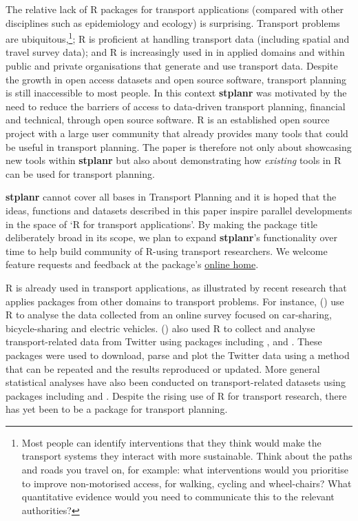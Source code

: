 The relative lack of R packages for transport applications
(compared with other disciplines such as epidemiology
and ecology) is surprising.
Transport
problems are ubiquitous,\footnote{Most people can identify interventions that they
  think would make the transport systems they interact with more
  sustainable. Think about the paths and roads you travel on, for
  example: what interventions would you prioritise to improve
  non-motorised access, for walking, cycling and wheel-chairs? What
  quantitative evidence would you need to communicate this to the
  relevant authorities?}; R is proficient at handling transport data
(including spatial and travel survey data);
and R is increasingly used in
in applied domains \citep{jalal_overview_2017,moore_why_2017}
and within public and private organisations that generate and use transport data.
Despite the growth in open access datasets and open source software, transport planning is still inaccessible to most people.
In this context \textbf{stplanr} was motivated by the need to reduce the barriers of access to data-driven transport planning, financial and technical, through open source software.
R is an established open source project with a large user community that already provides many tools that could be useful in transport planning.
The paper is therefore not only about showcasing new tools within \textbf{stplanr} but also about demonstrating how \emph{existing} tools in R can be used for transport planning.

\textbf{stplanr} cannot cover all bases in Transport Planning and it is hoped that the ideas, functions and datasets described in this paper inspire
parallel developments in the space of `R for transport applications'.
By making the package title deliberately broad in its scope, we plan to expand
\textbf{stplanr}'s functionality over time
to help build community of R-using
transport researchers. We welcome feature requests and feedback at the
package's \href{https://github.com/ropensci/stplanr/issues}{online
home}.

R is already used in transport applications, as illustrated by recent
research that applies packages from other domains to transport problems.
For instance, \citeauthor{efthymiou_use_2012}
(\citeyear{efthymiou_use_2012}) use R to analyse the data collected from
an online survey focused on car-sharing, bicycle-sharing and electric
vehicles. \citeauthor{efthymiou_use_2012}
(\citeyear{efthymiou_use_2012}) also used R to collect and analyse
transport-related data from Twitter using packages including
,  and . These packages
were used to download, parse and plot the Twitter data using a method
that can be repeated and the results reproduced or updated. More general
statistical analyses have also been conducted on transport-related
datasets using packages including  and 
\citep{diana_studying_2012,cerin_walking_2013}. Despite the rising use
of R for transport research, there has yet been to be a package for
transport planning.

